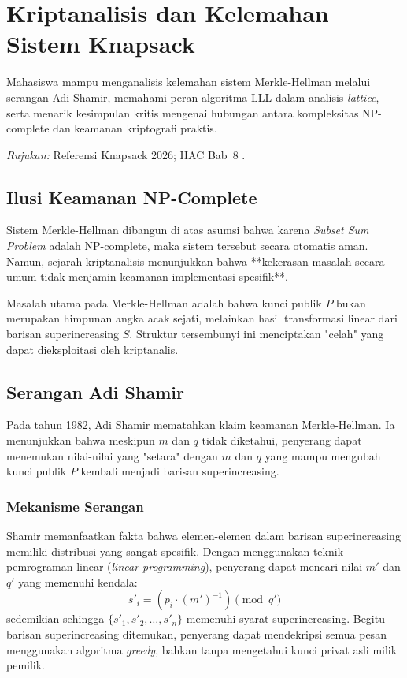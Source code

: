 \section{Kriptanalisis dan Kelemahan Sistem Knapsack}

\begin{subcpmk}
  \item Mahasiswa mampu menganalisis kelemahan sistem Merkle-Hellman melalui serangan Adi Shamir, memahami peran algoritma LLL dalam analisis \textit{lattice}, serta menarik kesimpulan kritis mengenai hubungan antara kompleksitas NP-complete dan keamanan kriptografi praktis.
\end{subcpmk}

\noindent\textit{Rujukan:} Referensi Knapsack 2026; HAC Bab~8 \cite{hac_online}.

\subsection{Ilusi Keamanan NP-Complete}

Sistem Merkle-Hellman dibangun di atas asumsi bahwa karena \textit{Subset Sum Problem} adalah NP-complete, maka sistem tersebut secara otomatis aman. Namun, sejarah kriptanalisis menunjukkan bahwa **kekerasan masalah secara umum tidak menjamin keamanan implementasi spesifik**.

Masalah utama pada Merkle-Hellman adalah bahwa kunci publik $P$ bukan merupakan himpunan angka acak sejati, melainkan hasil transformasi linear dari barisan superincreasing $S$. Struktur tersembunyi ini menciptakan "celah" yang dapat dieksploitasi oleh kriptanalis.

\subsection{Serangan Adi Shamir}

Pada tahun 1982, Adi Shamir mematahkan klaim keamanan Merkle-Hellman. Ia menunjukkan bahwa meskipun $m$ dan $q$ tidak diketahui, penyerang dapat menemukan nilai-nilai yang "setara" dengan $m$ dan $q$ yang mampu mengubah kunci publik $P$ kembali menjadi barisan superincreasing.

\subsubsection{Mekanisme Serangan}
Shamir memanfaatkan fakta bahwa elemen-elemen dalam barisan superincreasing memiliki distribusi yang sangat spesifik. Dengan menggunakan teknik pemrograman linear (\textit{linear programming}), penyerang dapat mencari nilai $m'$ dan $q'$ yang memenuhi kendala:
\begin{equation}
  s'_i = (p_i \cdot (m')^{-1}) \pmod{q'}
\end{equation}
sedemikian sehingga $\{s'_1, s'_2, \dots, s'_n\}$ memenuhi syarat superincreasing. Begitu barisan superincreasing ditemukan, penyerang dapat mendekripsi semua pesan menggunakan algoritma \textit{greedy}, bahkan tanpa mengetahui kunci privat asli milik pemilik.

